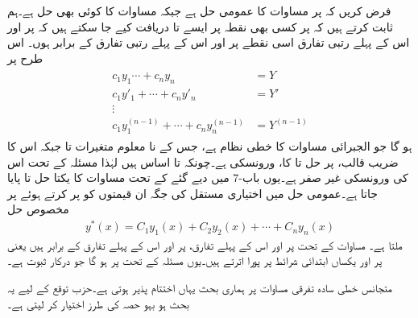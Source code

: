 
فرض کریں کہ  پر مساوات  کا عمومی حل  ہے جبکہ  مساوات  کا کوئی بھی حل ہے۔ہم ثابت کرتے ہیں کہ  پر کسی بھی نقطہ  پر ایسے  تا  دریافت کیے جا سکتے ہیں کہ  پر  اور اس کے پہلے  رتبی تفارق اسی نقطے پر  اور اس کے پہلے  رتبی تفارق کے برابر ہوں۔ اس طرح  پر 
\begin{gather}
\begin{aligned}\label{مساوات_سادہ_بلند_ورونسکی_سے_مستقل}
c_1y_1\cdots+c_ny_n&=Y\\
c_1y'_1+\cdots+c_ny'_n&=Y'\\
\vdots &\\
c_1y^{(n-1)}_1+\cdots+c_ny^{(n-1)}_n&=Y^{(n-1)}
\end{aligned}
\end{gather}
ہو گا جو الجبرائی مساوات کا خطی نظام ہے، جس کے نا معلوم متغیرات  تا  جبکہ اس کا  ضریب  قالب،  پر حل  تا  کا،  ورونسکی ہے۔چونکہ  تا  اساس ہیں لہٰذا مسئلہ  کے تحت اس کی ورونسکی غیر صفر ہے۔یوں باب-7 میں دیے گئے  کے تحت مساوات  کا یکتا حل 
  تا   پایا جاتا ہے۔عمومی حل میں اختیاری مستقل کی جگہ ان قیمتوں کو پر کرتے ہوئے  پر مخصوص حل
\begin{align*}
y^*(x)=C_1y_1(x)+C_2y_2(x)+\cdots+C_ny_n(x)
\end{align*}
ملتا ہے۔ مساوات  کے تحت  پر  اور اس کے پہلے  تفارق،  پر  اور اس کے پہلے  تفارق کے برابر ہیں یعنی  پر  اور  یکساں ابتدائی شرائط پر پورا اترتے ہیں۔یوں مسئلہ  کے تحت  پر  ہو گا جو درکار ثبوت ہے۔

متجانس خطی سادہ تفرقی مساوات پر ہماری بحث یہاں اختتام پذیر ہوتی ہے۔حزب توقع  کے لیے یہ بحث ہو بہو حصہ  کی طرز اختیار کر لیتی ہے۔

